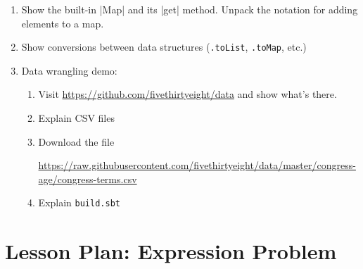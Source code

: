 \documentclass[9pt]{extbook}
\begin{document}
\begin{enumerate}
    \item Show the built-in \scalainline|Map| and its \scalainline|get|
      method. Unpack the notation for adding elements to a map.
  
    \item Show conversions between data structures (\lstinline|.toList|,
      \lstinline|.toMap|, etc.)
  
    \item Data wrangling demo:
  
      \begin{enumerate}
  
        
    \item Visit \url{https://github.com/fivethirtyeight/data} and show what's
    there.
  
    \item Explain CSV files
  
    \item Download the file
  
    \url{https://raw.githubusercontent.com/fivethirtyeight/data/master/congress-age/congress-terms.csv}
  
    \item Explain \texttt{build.sbt}
  
  \end{enumerate}
  
  
  \end{enumerate}

\chapter{Lesson Plan: Expression Problem}
\end{document}
